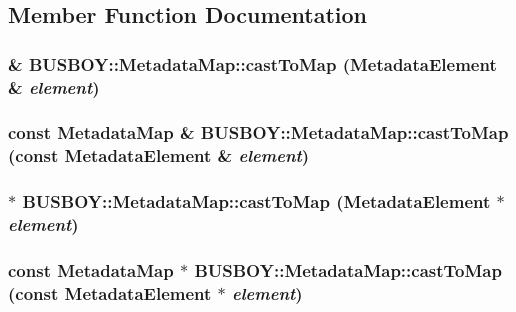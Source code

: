 \subsection{Member Function Documentation}
\hypertarget{classBUSBOY_1_1MetadataMap_a55e1c299d482e99d31fac7dbdb8ace62}{
\subsubsection[{castToMap}]{ \& BUSBOY::MetadataMap::castToMap ({\bf MetadataElement} \& {\em element})}}
\label{classBUSBOY_1_1MetadataMap_a55e1c299d482e99d31fac7dbdb8ace62}
\hypertarget{classBUSBOY_1_1MetadataMap_ae894474f65f24f7d1225588f63cadbf8}{
\subsubsection[{castToMap}]{\setlength{\rightskip}{0pt plus 5cm}const {\bf MetadataMap} \& BUSBOY::MetadataMap::castToMap (const {\bf MetadataElement} \& {\em element})}}
\label{classBUSBOY_1_1MetadataMap_ae894474f65f24f7d1225588f63cadbf8}
\hypertarget{classBUSBOY_1_1MetadataMap_a244835d85f8ef2062d630d1f03ca7b54}{
\subsubsection[{castToMap}]{ $\ast$ BUSBOY::MetadataMap::castToMap ({\bf MetadataElement} $\ast$ {\em element})}}
\label{classBUSBOY_1_1MetadataMap_a244835d85f8ef2062d630d1f03ca7b54}
\hypertarget{classBUSBOY_1_1MetadataMap_add9f26ea2cb4cc406f5683ed467e787e}{
\subsubsection[{castToMap}]{\setlength{\rightskip}{0pt plus 5cm}const {\bf MetadataMap} $\ast$ BUSBOY::MetadataMap::castToMap (const {\bf MetadataElement} $\ast$ {\em element})}}
